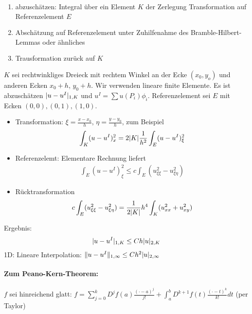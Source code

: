 \begin{enumerate}
\item abzuschätzen: Integral über ein Element $K$ der Zerlegung
 Transformation auf Referenzelement $E$
\item  Abschätzung auf Referenzelement unter Zuhilfenahme des Bramble-Hilbert-Lemmas oder ähnliches
\item  Trausformation zurück auf $K$
\end{enumerate}
\begin{beispiel}
  $K$ sei rechtwinkliges Dreieck mit rechtem Winkel an der Ecke $(x_0, y_o)$ und anderen Ecken $x_0 + h$, $y_0 + h$. Wir verwenden lineare finite Elemente. Es ist abzuschätzen $|u - u^I|_{1, K}$ und $u^I = \sum u (P_i)\phi_i$. Referenzelement sei $E$ mit Ecken $(0,0), (0,1), (1,0)$.
  \begin{itemize}
  \item Transformation: $\xi = \frac {x - x_0} h$, $\eta = \frac {y - y_0} h$, zum Beispiel
    \begin{align*}
      \int_K (u-u^I)^2_x = 2 |K| \frac 1 {h^2} \int_E(u-u^I)_\xi^2
    \end{align*}
\item Referenzelemt: Elementare Rechnung liefert
  \begin{align*}
    \int_E (u-u^I)_\xi^2 \leq  c\int_E (u_{\xi \xi}^2 -u_{\xi\eta}^2) 
  \end{align*}
\item Rücktransformation 
  \begin{align*}
     c\int_E (u_{\xi \xi}^2 -u_{\xi\eta}^2) = \frac 1 {2 |K|}h^4 \int_K(u_{xx}^2 + u_{xy}^2)
  \end{align*}
  \end{itemize}
Ergebnis:
\begin{align*}
  |u-u^I|_{1, K} \leq C h |u|_{2, K}
\end{align*}
1D: Lineare Interpolation: $\|u-u^I\|_{1, \infty} \leq Ch^2|u| _{2, \infty}$
\end{beispiel}


\paragraph{Zum Peano-Kern-Theorem:}
$f$ sei hinreichend glatt: $f = \sum_{j = 0}^kD^jf(a)\frac{(\cdot - a)^j}{j!} + \int_a^bD^{k+1}f(t)\frac{(\cdot - t)^k}{k!}dt$ (per Taylor)

